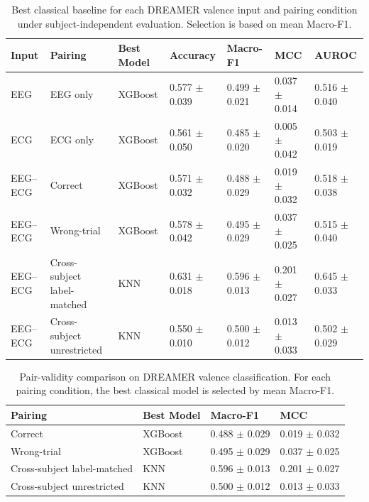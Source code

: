 \begin{table}[!t]
\centering
\caption{Best classical baseline for each DREAMER valence input and pairing condition under subject-independent evaluation. Selection is based on mean Macro-F1.}
\label{tab:dreamer_valence_best_classical}
\begin{tabular}{lllllll}
\toprule
Input & Pairing & Best Model & Accuracy & Macro-F1 & MCC & AUROC \\
\midrule
EEG & EEG only & XGBoost & 0.577 $\pm$ 0.039 & 0.499 $\pm$ 0.021 & 0.037 $\pm$ 0.014 & 0.516 $\pm$ 0.040 \\
ECG & ECG only & XGBoost & 0.561 $\pm$ 0.050 & 0.485 $\pm$ 0.020 & 0.005 $\pm$ 0.042 & 0.503 $\pm$ 0.019 \\
EEG--ECG & Correct & XGBoost & 0.571 $\pm$ 0.032 & 0.488 $\pm$ 0.029 & 0.019 $\pm$ 0.032 & 0.518 $\pm$ 0.038 \\
EEG--ECG & Wrong-trial & XGBoost & 0.578 $\pm$ 0.042 & 0.495 $\pm$ 0.029 & 0.037 $\pm$ 0.025 & 0.515 $\pm$ 0.040 \\
EEG--ECG & Cross-subject label-matched & KNN & 0.631 $\pm$ 0.018 & 0.596 $\pm$ 0.013 & 0.201 $\pm$ 0.027 & 0.645 $\pm$ 0.033 \\
EEG--ECG & Cross-subject unrestricted & KNN & 0.550 $\pm$ 0.010 & 0.500 $\pm$ 0.012 & 0.013 $\pm$ 0.033 & 0.502 $\pm$ 0.029 \\
\bottomrule
\end{tabular}
\end{table}

\begin{table}[!t]
\centering
\caption{Pair-validity comparison on DREAMER valence classification. For each pairing condition, the best classical model is selected by mean Macro-F1.}
\label{tab:dreamer_valence_pair_validity}
\begin{tabular}{llll}
\toprule
Pairing & Best Model & Macro-F1 & MCC \\
\midrule
Correct & XGBoost & 0.488 $\pm$ 0.029 & 0.019 $\pm$ 0.032 \\
Wrong-trial & XGBoost & 0.495 $\pm$ 0.029 & 0.037 $\pm$ 0.025 \\
Cross-subject label-matched & KNN & 0.596 $\pm$ 0.013 & 0.201 $\pm$ 0.027 \\
Cross-subject unrestricted & KNN & 0.500 $\pm$ 0.012 & 0.013 $\pm$ 0.033 \\
\bottomrule
\end{tabular}
\end{table}

